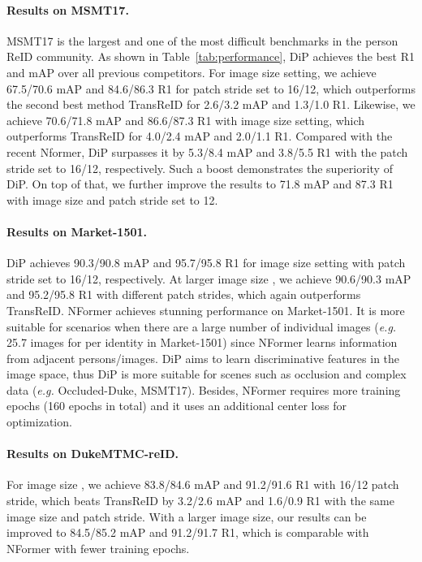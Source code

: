 \documentclass[10pt,twocolumn,letterpaper]{article}
\begin{document}
\vspace{-0.4cm}
\paragraph{Results on MSMT17.}
MSMT17 is the largest and one of the most difficult benchmarks in the person ReID community. As shown in Table~\ref{tab:performance}, DiP achieves the best R1 and mAP over all previous competitors. For  image size setting, we achieve 67.5/70.6 mAP and 84.6/86.3 R1 for patch stride set to 16/12, which outperforms the second best method TransReID\cite{He_2021_ICCV} for 2.6/3.2 mAP and 1.3/1.0 R1. Likewise, we achieve 70.6/71.8 mAP and 86.6/87.3 R1 with  image size setting, which outperforms TransReID for 4.0/2.4 mAP and 2.0/1.1 R1. Compared with the recent Nformer\cite{wang2022nformer}, DiP surpasses it by 5.3/8.4 mAP and 3.8/5.5 R1 with the patch stride set to 16/12, respectively. Such a boost demonstrates the superiority of DiP. On top of that, we further improve the results to 71.8 mAP and 87.3 R1 with  image size and patch stride set to 12.

\vspace{-0.4cm}
\paragraph{Results on Market-1501.}
DiP achieves 90.3/90.8 mAP and 95.7/95.8 R1 for  image size setting with patch stride set to 16/12, respectively. At larger image size , we achieve 90.6/90.3 mAP and 95.2/95.8 R1 with different patch strides, which again outperforms TransReID\cite{He_2021_ICCV}.
NFormer achieves stunning performance on Market-1501. It is more suitable for scenarios when there are a large number of individual images (\textit{e.g.} 25.7 images for per identity in Market-1501) since NFormer learns information from adjacent persons/images. DiP aims to learn discriminative features in the image space, thus DiP is more suitable for scenes such as occlusion and complex data (\textit{e.g.} Occluded-Duke, MSMT17). Besides, NFormer requires more training epochs (160 epochs in total) and it uses an additional center loss for optimization.

\vspace{-0.4cm}
\paragraph{Results on DukeMTMC-reID.}
For image size , we achieve 83.8/84.6 mAP and 91.2/91.6 R1 with 16/12 patch stride, which beats TransReID by 3.2/2.6 mAP and 1.6/0.9 R1 with the same image size and patch stride. With a larger image size, our results can be improved to 84.5/85.2 mAP and 91.2/91.7 R1, which is comparable with NFormer with fewer training epochs.
\end{document}
